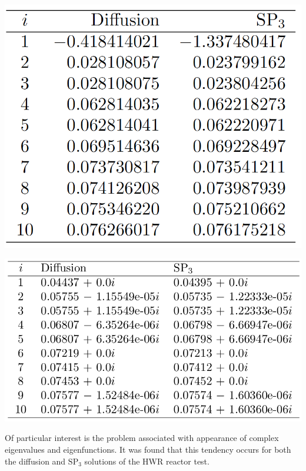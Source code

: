 \documentclass[a1paper,fontscale=0.6]{poster}
\begin{document}
\begin{poster}
{\begin{minipage}{0.5\textwidth}
\begin{center}
\includegraphics[width=0.7\linewidth]{spectral/iaea2d_alpha_10.png}\\
\end{center}
\end{minipage}
\begin{minipage}{0.5\textwidth}
\begin{center}
\includegraphics[width=1\linewidth]{spectral/hwr_alpha_del_10.png}\\
\end{center}
\end{minipage}

Of particular interest is the problem associated with appearance of complex eigenvalues and eigenfunctions. 
It was found that this tendency occurs for both the diffusion and $\mathrm{SP_3}$ solutions of the HWR reactor test. 

}
\end{poster}
\end{document}
